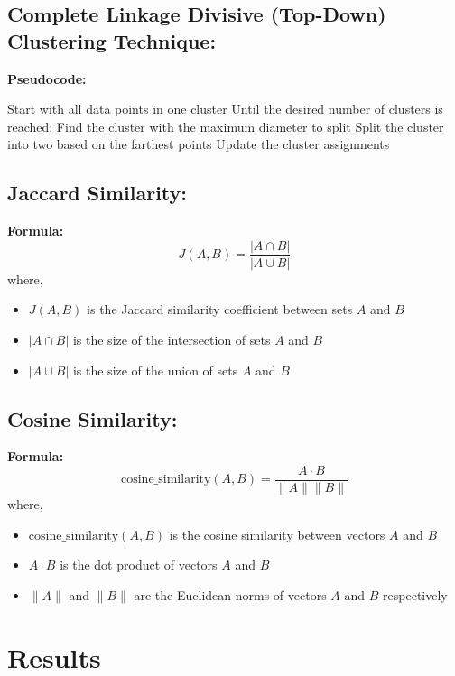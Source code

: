 \documentclass[12pt]{article}
\begin{document}
	\subsection{Complete Linkage Divisive (Top-Down) Clustering Technique:}
	\textbf{Pseudocode:} \\
	\begin{algorithmic}
	\State Start with all data points in one cluster
	\State Until the desired number of clusters is reached:
	\State \quad Find the cluster with the maximum diameter to split
	\State \quad Split the cluster into two based on the farthest points
	\State \quad Update the cluster assignments
	\end{algorithmic}
	
	\subsection{Jaccard Similarity:}
	\textbf{Formula:}
	\[
	J(A, B) = \frac{|A \cap B|}{|A \cup B|}
	\]
	where,
	\begin{itemize}
		\item $J(A, B)$ is the Jaccard similarity coefficient between sets $A$ and $B$
		\item $|A \cap B|$ is the size of the intersection of sets $A$ and $B$
		\item $|A \cup B|$ is the size of the union of sets $A$ and $B$
	\end{itemize}

	\subsection{Cosine Similarity:}
	\textbf{Formula:}
	\[
	\text{cosine\_similarity}(A, B) = \frac{A \cdot B}{\|A\| \|B\|}
	\]
	where,
	\begin{itemize}
		\item $\text{cosine\_similarity}(A, B)$ is the cosine similarity between vectors $A$ and $B$
		\item $A \cdot B$ is the dot product of vectors $A$ and $B$
		\item $\|A\|$ and $\|B\|$ are the Euclidean norms of vectors $A$ and $B$ respectively
	\end{itemize}
	
	
	\section{Results}
\end{document}
